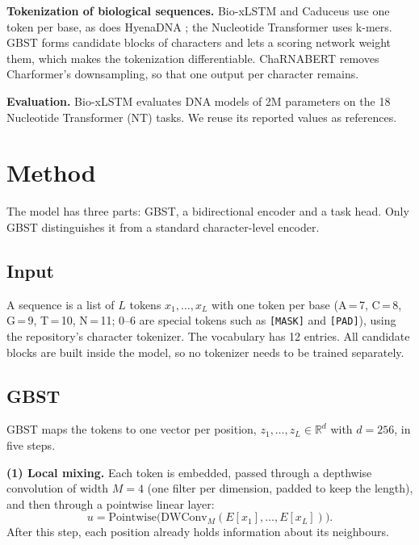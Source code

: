 \documentclass{article}
\begin{document}
\textbf{Tokenization of biological sequences.} Bio-xLSTM and Caduceus \citep{schiff2024caduceus} use
one token per base, as does HyenaDNA \citep{nguyen2023hyenadna}; the Nucleotide Transformer
\citep{dallatorre2023nt} uses k-mers. GBST \citep{tay2022charformer} forms candidate blocks of
characters and lets a scoring network weight them, which makes the tokenization differentiable.
ChaRNABERT removes Charformer's downsampling, so that one output per character remains.

\textbf{Evaluation.} Bio-xLSTM evaluates DNA models of 2M parameters on the 18 Nucleotide Transformer
(NT) tasks. We reuse its reported values as references.

\section{Method}\label{sec:method}

The model has three parts: GBST, a bidirectional encoder and a task head. Only GBST distinguishes
it from a standard character-level encoder.

\subsection{Input}

A sequence is a list of $L$ tokens $x_1,\dots,x_L$ with one token per base (A\,=\,7, C\,=\,8, G\,=\,9,
T\,=\,10, N\,=\,11; 0--6 are special tokens such as \texttt{[MASK]} and \texttt{[PAD]}), using the
repository's character tokenizer. The vocabulary has 12 entries. All candidate blocks are built
inside the model, so no tokenizer needs to be trained separately.

\subsection{GBST}\label{sec:gbst}

GBST maps the tokens to one vector per position, $z_1,\dots,z_L\in\mathbb{R}^{d}$ with $d=256$, in
five steps.

\textbf{(1) Local mixing.} Each token is embedded, passed through a depthwise convolution of width
$M=4$ (one filter per dimension, padded to keep the length), and then through a pointwise linear layer:
\begin{equation}
  u = \mathrm{Pointwise}\big(\mathrm{DWConv}_M(E[x_1],\dots,E[x_L])\big).
\end{equation}
After this step, each position already holds information about its neighbours.
\end{document}
